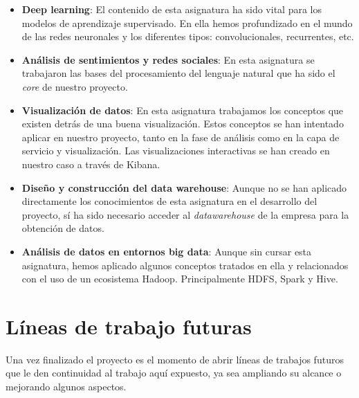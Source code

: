 \begin{itemize}
\item  \textbf{Deep learning}: El contenido de esta asignatura ha sido vital para los modelos de aprendizaje supervisado. En ella hemos profundizado en el mundo de las redes neuronales y los diferentes tipos: convolucionales, recurrentes, etc.

\item  \textbf{Análisis de sentimientos y redes sociales}: En esta asignatura se trabajaron las bases del procesamiento del lenguaje natural que ha sido el \textit{core} de nuestro proyecto.

\item  \textbf{Visualización de datos}: En esta asignatura trabajamos los conceptos que existen detrás de una buena visualización. Estos conceptos se han intentado aplicar en nuestro proyecto, tanto en la fase de análisis como en la capa de servicio y visualización. Las visualizaciones interactivas se han creado en nuestro caso a través de Kibana.

\item  \textbf{Diseño y construcción del data warehouse}: Aunque no se han aplicado directamente los conocimientos de esta asignatura en el desarrollo del proyecto, sí ha sido necesario acceder al \textit{datawarehouse} de la empresa para la obtención de datos.


\item \textbf{Análisis de datos en entornos big data}: Aunque sin cursar esta asignatura, hemos aplicado algunos conceptos tratados en ella y relacionados con el uso de un ecosistema Hadoop. Principalmente HDFS, Spark y Hive.


\end{itemize}





\section{Líneas de trabajo futuras}
\label{section:con:fut}

Una vez finalizado el proyecto es el momento de abrir líneas de trabajos futuros que le den continuidad al trabajo aquí expuesto, ya sea ampliando su alcance o mejorando algunos aspectos.




